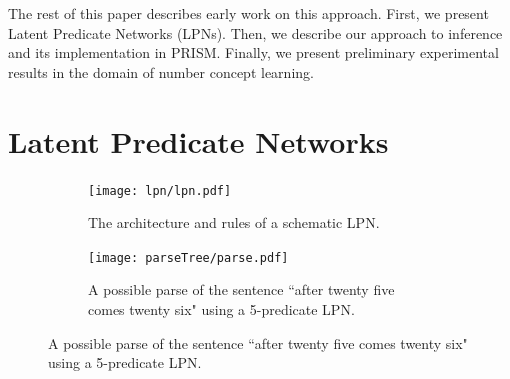 \documentclass{article} %
\begin{document}




The rest of this paper describes early work on this approach. First,
we present Latent Predicate Networks (LPNs). Then, we describe our
approach to inference and its implementation in PRISM. Finally, we
present preliminary experimental results in the domain of number
concept learning.

\section{Latent Predicate Networks}

\begin{figure}[t]
  \begin{subfigure}[b]{0.5\linewidth}
    \texttt{[image: lpn/lpn.pdf]}
    \caption{The architecture and rules of a schematic LPN.}
    \label{fig:architecture}
  \end{subfigure}
  \hfill
  \begin{subfigure}[b]{0.5\linewidth}
    \texttt{[image: parseTree/parse.pdf]}
    \caption{A possible parse of the sentence ``after twenty five comes twenty six" using a 5-predicate LPN.}
    \label{fig:parseexample}
  \end{subfigure}
\end{figure}
\end{document}
